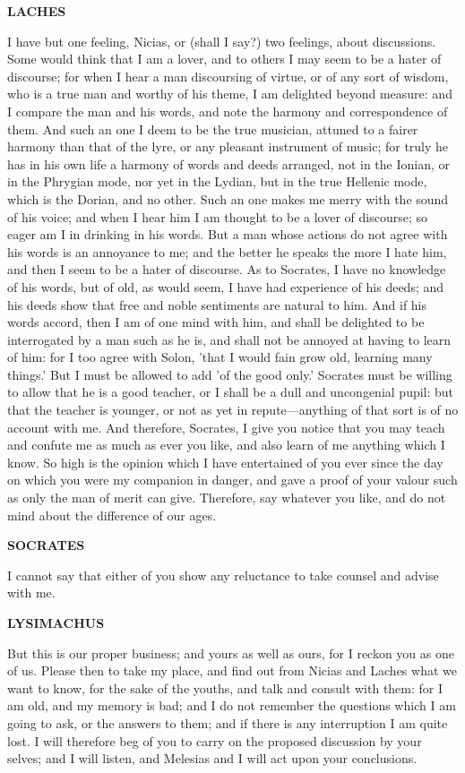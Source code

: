 \documentclass[11pt,letter]{article}
\begin{document}
\par \textbf{LACHES}
\par   I have but one feeling, Nicias, or (shall I say?) two feelings, about discussions. Some would think that I am a lover, and to others I may seem to be a hater of discourse; for when I hear a man discoursing of virtue, or of any sort of wisdom, who is a true man and worthy of his theme, I am delighted beyond measure:  and I compare the man and his words, and note the harmony and correspondence of them. And such an one I deem to be the true musician, attuned to a fairer harmony than that of the lyre, or any pleasant instrument of music; for truly he has in his own life a harmony of words and deeds arranged, not in the Ionian, or in the Phrygian mode, nor yet in the Lydian, but in the true Hellenic mode, which is the Dorian, and no other. Such an one makes me merry with the sound of his voice; and when I hear him I am thought to be a lover of discourse; so eager am I in drinking in his words. But a man whose actions do not agree with his words is an annoyance to me; and the better he speaks the more I hate him, and then I seem to be a hater of discourse. As to Socrates, I have no knowledge of his words, but of old, as would seem, I have had experience of his deeds; and his deeds show that free and noble sentiments are natural to him. And if his words accord, then I am of one mind with him, and shall be delighted to be interrogated by a man such as he is, and shall not be annoyed at having to learn of him:  for I too agree with Solon, 'that I would fain grow old, learning many things.' But I must be allowed to add 'of the good only.' Socrates must be willing to allow that he is a good teacher, or I shall be a dull and uncongenial pupil:  but that the teacher is younger, or not as yet in repute—anything of that sort is of no account with me. And therefore, Socrates, I give you notice that you may teach and confute me as much as ever you like, and also learn of me anything which I know. So high is the opinion which I have entertained of you ever since the day on which you were my companion in danger, and gave a proof of your valour such as only the man of merit can give. Therefore, say whatever you like, and do not mind about the difference of our ages.

\par \textbf{SOCRATES}
\par   I cannot say that either of you show any reluctance to take counsel and advise with me.

\par \textbf{LYSIMACHUS}
\par   But this is our proper business; and yours as well as ours, for I reckon you as one of us. Please then to take my place, and find out from Nicias and Laches what we want to know, for the sake of the youths, and talk and consult with them:  for I am old, and my memory is bad; and I do not remember the questions which I am going to ask, or the answers to them; and if there is any interruption I am quite lost. I will therefore beg of you to carry on the proposed discussion by your selves; and I will listen, and Melesias and I will act upon your conclusions.
\end{document}
